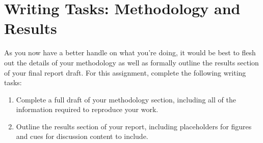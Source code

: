 \documentclass[11pt]{article}
\begin{document}
	


\section{Writing Tasks: Methodology and Results}

As you now have a better handle on what you're doing, it would be best to flesh out the details of your methodology as well as formally outline the results section of your final report draft.
For this assignment, complete the following writing tasks:

\begin{enumerate}[label=\alph*.]
	\item Complete a full draft of your methodology section, including all of the information required to reproduce your work.  
	\item Outline the results section of your report, including placeholders for figures and cues for discussion content to include.
\end{enumerate}
	
	
\end{document}
